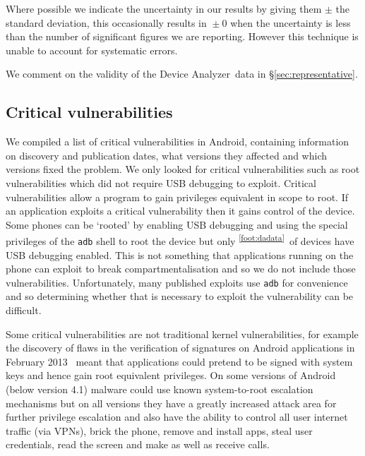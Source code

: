 \documentclass[conference,a4paper,twoside]{IEEEtran}
\let\OldTodo\todo
\renewcommand{\todo}{\OldTodo[inline]}
\newcommand{\todolater}[1]{}%
\newcommand{\da}{Device Analyzer}
\newcommand{\dafoot}{\textsuperscript{\ref{foot:dadata}}}
\begin{document}
Where possible we indicate the uncertainty in our results by giving them $\pm$ the standard deviation, this occasionally results in ${} \pm 0$ when the uncertainty is less than the number of significant figures we are reporting.
However this technique is unable to account for systematic errors.

We comment on the validity of the \da\ data in \S\ref{sec:representative}.



\subsection{Critical vulnerabilities}
We compiled a list of critical vulnerabilities in Android, containing information on discovery and publication dates, what versions they affected and which versions fixed the problem.
We only looked for critical vulnerabilities such as root vulnerabilities which did not require USB debugging to exploit.
Critical vulnerabilities allow a program to gain privileges equivalent in scope to root.
If an application exploits a critical vulnerability then it gains control of the device.
Some phones can be `rooted' by enabling USB debugging and using the special privileges of the \texttt{adb} shell to root the device but only \daAdbEnabledPerc\dafoot\ of devices have USB debugging enabled.
This is not something that applications running on the phone can exploit to break compartmentalisation and so we do not include those vulnerabilities.
Unfortunately, many published exploits use \texttt{adb} for convenience and so determining whether that is necessary to exploit the vulnerability can be difficult.

Some critical vulnerabilities are not traditional kernel vulnerabilities, for example the discovery of flaws in the verification of signatures on Android applications in February 2013~\cite{Forristal2013} meant that applications could pretend to be signed with system keys and hence gain root equivalent privileges.
On some versions of Android (below version 4.1) malware could use known system-to-root escalation mechanisms but on all versions they have a greatly increased attack area for further privilege escalation and also have the ability to control all user internet traffic (via VPNs), brick the phone, remove and install apps, steal user credentials, read the screen and make as well as receive calls.
\todolater{break vulnerabilities down by attack vector?}
\avoTabAndVulns
\end{document}
